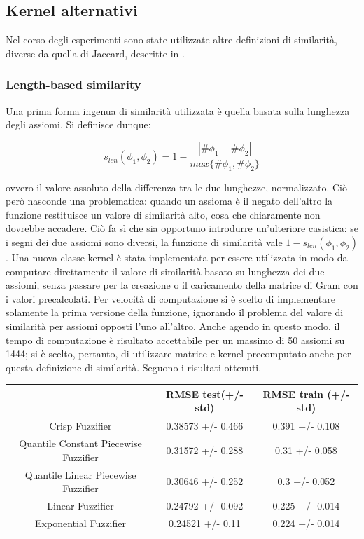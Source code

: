 \documentclass[12pt,a4paper]{report}
\begin{document}
\subsection{Kernel alternativi}
Nel corso degli esperimenti sono state utilizzate altre definizioni di similarità, diverse da quella di Jaccard, descritte in \cite{drtpaper}.
\subsubsection{Length-based similarity}
Una prima forma ingenua di similarità utilizzata è quella basata sulla lunghezza degli assiomi.
Si definisce dunque:

\[ s_{len}(\phi_1, \phi_2) = 1 - \frac{|\# \phi_1 - \# \phi_2|}{max\{\#\phi_1, \#\phi_2\}}\]

ovvero il valore assoluto della differenza tra le due lunghezze, normalizzato.
Ciò però nasconde una problematica: quando un assioma è il negato dell'altro la funzione restituisce un valore di similarità alto, cosa che chiaramente non dovrebbe accadere. Ciò fa sì che sia opportuno introdurre un'ulteriore casistica: se i segni dei due assiomi sono diversi, la funzione di similarità vale $1 - s_{len}(\phi_1,\phi_2)$.
Una nuova classe kernel è stata implementata per essere utilizzata in modo da computare direttamente il valore di similarità basato su lunghezza dei due assiomi, senza passare per la creazione o il caricamento della matrice di Gram con i valori precalcolati.
Per velocità di computazione si è scelto di implementare solamente la prima versione della funzione, ignorando il problema del valore di similarità per assiomi opposti l'uno all'altro.
Anche agendo in questo modo, il tempo di computazione è risultato accettabile per un massimo di 50 assiomi su 1444; si è scelto, pertanto, di utilizzare matrice e kernel precomputato anche per questa definizione di similarità. Seguono i risultati ottenuti.

\begin{table}[h!]
\small
\centering 	
	\begin{tabular}{|c|c|c|} 
	 \hline
	  & RMSE test(+/- std) & RMSE train (+/- std)\\ [0.5ex] 
	 \hline
	 Crisp Fuzzifier & 0.38573 +/- 0.466 & 0.391 +/- 0.108 \\ 
	 \hline
	 Quantile Constant Piecewise Fuzzifier & 0.31572 +/- 0.288 & 0.31 +/- 0.058\\
	 \hline
	 Quantile Linear Piecewise Fuzzifier & 0.30646 +/- 0.252 & 0.3 +/- 0.052\\
	 \hline
	 Linear Fuzzifier & 0.24792 +/- 0.092 & 0.225 +/- 0.014\\
	 \hline
	 Exponential Fuzzifier & 0.24521 +/- 0.11 & 0.224 +/- 0.014\\ [1ex] 
	 \hline
	\end{tabular}
\end{table}
\end{document}
